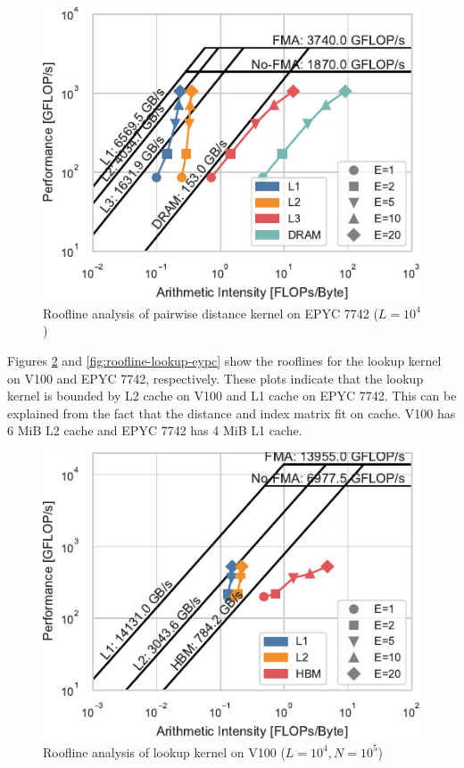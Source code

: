 \documentclass[sigconf]{acmart}
\begin{document}
\begin{figure}
    \centering
    \includegraphics{figs/roofline_distances_epyc}
    \caption{Roofline analysis of pairwise distance kernel on EPYC 7742 ($L=10^4$)}%
    \label{fig:roofline-distances-epyc}
\end{figure}

Figures \ref{fig:roofline-lookup-v100} and \ref{fig:roofline-lookup-eypc} show
the rooflines for the lookup kernel on V100 and EPYC 7742, respectively.
These plots indicate that the lookup kernel is bounded by L2 cache on V100 and
L1 cache on EPYC 7742. This can be explained from the fact that the distance
and index matrix fit on cache. V100 has 6 MiB L2 cache and EPYC 7742 has 4 MiB
L1 cache.

\begin{figure}
    \centering
    \includegraphics{figs/roofline_lookup_wo_rho_v100}
    \caption{Roofline analysis of lookup kernel on V100 ($L=10^4, N=10^5$)}%
    \label{fig:roofline-lookup-v100}
\end{figure}
\end{document}
